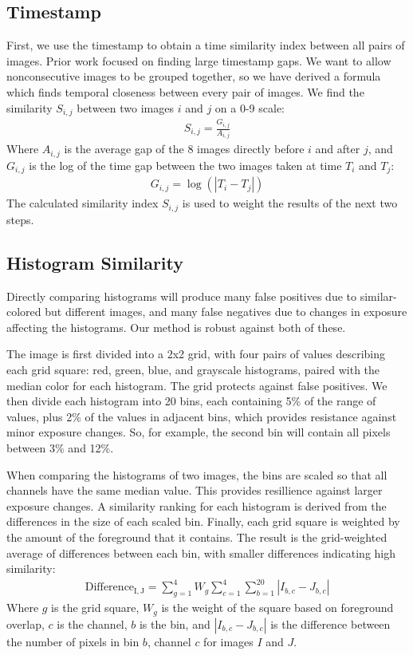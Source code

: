 \documentclass{article}
\begin{document}
\subsection{Timestamp}
First, we use the timestamp to obtain a time similarity index between all pairs of images. Prior work focused on finding large timestamp gaps\cite{1292402}. We want to allow nonconsecutive images to be grouped together, so we have derived a formula which finds temporal closeness between every pair of images. We find the similarity \(S_{i,j}\) between two images \(i\) and \(j\) on a 0-9 scale:
\begin{eqnarray}
S_{i,j}=\frac{G_{i,j}}{A_{i,j}}
\end{eqnarray}
Where \(A_{i,j}\) is the average gap of the 8 images directly before \(i\) and after \(j\), and  \(G_{i,j}\) is the log of the time gap between the two images taken at time \(T_i\) and \(T_j\):
\begin{eqnarray}
G_{i,j}=\log(|T_i-T_j|)
\end{eqnarray}
The calculated similarity index \(S_{i,j}\) is used to weight the results of the next two steps.


\subsection{Histogram Similarity}
Directly comparing histograms will produce many false positives due to similar-colored but different images, and many false negatives due to changes in exposure affecting the histograms. Our method is robust against both of these.

The image is first divided into a 2x2 grid, with four pairs of values describing each grid square: red, green, blue, and grayscale histograms, paired with the median color for each histogram. The grid protects against false positives. We then divide each histogram into 20 bins, each containing 5\% of the range of values, plus 2\% of the values in adjacent bins, which provides resistance against minor exposure changes. So, for example, the second bin will contain all pixels between 3\% and 12\%.

When comparing the histograms of two images, the bins are scaled so that all channels have the same median value. This provides resillience against larger exposure changes. A similarity ranking for each histogram is derived from the differences in the size of each scaled bin. Finally, each grid square is weighted by the amount of the foreground that it contains. The result is the grid-weighted average of differences between each bin, with smaller differences indicating high similarity:
\begin{eqnarray}
\mathrm{Difference_{I,J}}=\displaystyle\sum\limits_{g=1}^4W_g\sum\limits_{c=1}^4\sum\limits_{b=1}^{20} |I_{b,c} - J_{b,c}|
\end{eqnarray}
Where \(g\) is the grid square, \(W_g\) is the weight of the square based on foreground overlap, \(c\) is the channel, \(b\) is the bin, and \(|I_{b,c}-J_{b,c}|\) is the difference between the number of pixels in bin \(b\), channel \(c\) for images \(I\) and \(J\).
\end{document}
